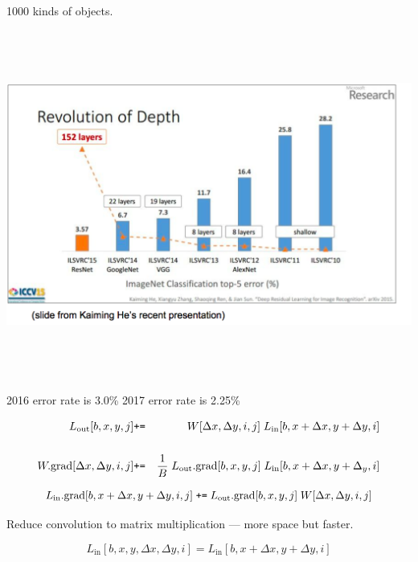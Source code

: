 {

1000 kinds of objects.

\vfill
\centerline{\includegraphics[height=4.5in]{../images/IVLSRC}}
2016 error rate is 3.0\% \hspace{1.0in} 2017 error rate is 2.25\%


\begin{eqnarray*}
  L_{\mathrm{out}}[b,x,y,j] & \mbox{\tt +=} &   W[\Delta x, \Delta y, i, j]\;L_{\mathrm{in}}[b,x + \Delta x, y + \Delta y, i] \\
  \\
  W.\mathrm{grad}[\Delta x, \Delta y,i,j] & \mbox{\tt +=} & \frac{1}{B}\; L_{\mathrm{out}}.\mathrm{grad}[b,x,y,j]\;L_{\mathrm{in}}[b,x + \Delta x,y+ \Delta_y,i]
\end{eqnarray*}

$$L_{\mathrm{in}}.\mathrm{grad}[b,x+\Delta x,y+\Delta y,i,j] \;\mbox{\tt +=} \; L_{\mathrm{out}}.\mathrm{grad}[b,x,y,j]\;W[\Delta x, \Delta y, i, j]$$


Reduce convolution to matrix multiplication ---  more space but faster.
{\huge
  $$L_{\mathrm{in}}[b,x,y,\Delta x,\Delta y,i] = L_{\mathrm{in}}[b,x+\Delta x,y+\Delta y,i]$$

}}
